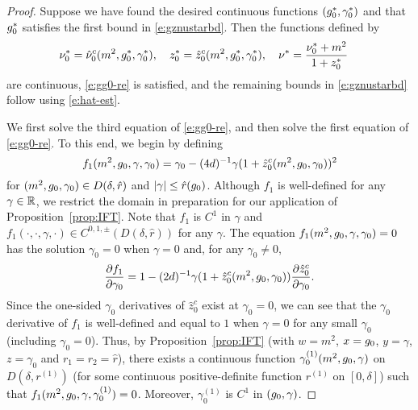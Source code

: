 \begin{proof}
Suppose we have found the desired continuous functions $(g_0^*, \gamma_0^*)$
and that $g_0^*$ satisfies the first bound in \eqref{e:gznustarbd}.
Then the functions defined by
\begin{align}
&\nu_0^* = \hat\nu_0^c(m^2, g_0^*, \gamma_0^*), \quad
z_0^* = \hat z_0^c(m^2, g_0^*, \gamma_0^*), \quad
\nu^* = \frac{\nu_0^* + m^2}{1 + z_0^*}
\end{align}
are continuous, \eqref{e:gg0-re} is satisfied, and
the remaining bounds in
\eqref{e:gznustarbd}
follow using \eqref{e:hat-est}.

We first solve the third equation of \eqref{e:gg0-re}, and then solve the first equation
of \eqref{e:gg0-re}.
To this end, we begin by defining
\begin{equation}
f_1(m^2, g_0, \gamma, \gamma_0)
	=
\gamma_0 - (4d)^{-1} \gamma (1 + \hat z_0^c(m^2, g_0, \gamma_0))^2
\end{equation}
for $(m^2, g_0, \gamma_0) \in D(\delta, \hat r)$
and $|\gamma| \le \hat r(g_0)$.
Although $f_1$ is well-defined
for any $\gamma \in {\mathbb R}$, we restrict the domain in preparation
for our application of Proposition~\ref{prop:IFT}.
Note that $f_1$ is $C^1$ in $\gamma$ and
$f_1(\cdot, \cdot, \gamma, \cdot) \in C^{0,1,\pm}(D(\delta, \hat r))$ for any $\gamma$.
The equation $f_1(m^2, g_0, \gamma, \gamma_0) = 0$
has the solution $\gamma_0 = 0$ when $\gamma = 0$
and, for any $\gamma_0 \neq 0$,
\begin{equation}
\frac{\partial f_1}{\partial \gamma_0}
	=
1 - (2d)^{-1} \gamma (1 + \hat z_0^c(m^2, g_0, \gamma_0)) \frac{\partial \hat z_0^c}{\partial \gamma_0}.
\end{equation}
Since the one-sided $\gamma_0$ derivatives of $\hat z_0^c$ exist at $\gamma_0 = 0$,
we can see
that the $\gamma_0$ derivative of $f_1$ is well-defined
and equal to $1$ when $\gamma = 0$ for any small $\gamma_0$ (including $\gamma_0 = 0$).
Thus, by Proposition~\ref{prop:IFT}
(with $w = m^2$, $x = g_0$, $y = \gamma$, $z = \gamma_0$
and $r_1 = r_2 = \hat r$),
there exists a continuous function $\gamma^{(1)}_0(m^2, g_0, \gamma)$
on $D(\delta, r^{(1)})$ (for some continuous positive-definite function $r^{(1)}$ on $[0, \delta]$)
such that $f_1(m^2, g_0, \gamma, \gamma^{(1)}_0) = 0$.
Moreover, $\gamma^{(1)}_0$ is $C^1$ in $(g_0, \gamma)$.


\end{proof}
